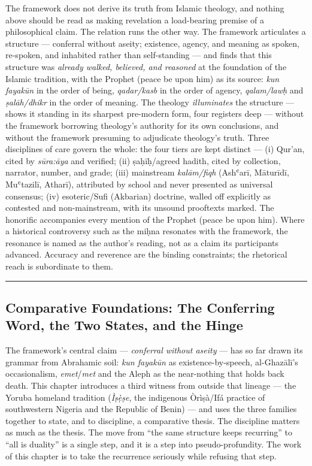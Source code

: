 \documentclass[11pt]{article}
\begin{document}
The framework does not derive its truth from Islamic theology, and nothing above should be read as making revelation a load-bearing premise of a philosophical claim. The relation runs the other way. The framework articulates a structure — conferral without aseity; existence, agency, and meaning as spoken, re-spoken, and inhabited rather than self-standing — and finds that this structure was \emph{already walked, believed, and reasoned} at the foundation of the Islamic tradition, with the Prophet (peace be upon him) as its source: \emph{kun fayakūn} in the order of being, \emph{qadar/\allowbreak{}kasb} in the order of agency, \emph{qalam/\allowbreak{}lawḥ} and \emph{ṣalāh/\allowbreak{}dhikr} in the order of meaning. The theology \emph{illuminates} the structure — shows it standing in its sharpest pre-modern form, four registers deep — without the framework borrowing theology's authority for its own conclusions, and without the framework presuming to adjudicate theology's truth. Three disciplines of care govern the whole: the four tiers are kept distinct — (i) Qur'an, cited by \emph{sūra:āya} and verified; (ii) ṣaḥīḥ/\allowbreak{}agreed hadith, cited by collection, narrator, number, and grade; (iii) mainstream \emph{kalām/\allowbreak{}fiqh} (Ashʿarī, Māturīdī, Muʿtazilī, Atharī), attributed by school and never presented as universal consensus; (iv) esoteric/\allowbreak{}Sufi (Akbarian) doctrine, walled off explicitly as contested and non-mainstream, with its unsound prooftexts marked. The honorific accompanies every mention of the Prophet (peace be upon him). Where a historical controversy such as the miḥna resonates with the framework, the resonance is named as the author's reading, not as a claim its participants advanced. Accuracy and reverence are the binding constraints; the rhetorical reach is subordinate to them.

\medskip\noindent\rule{\linewidth}{0.3pt}\medskip

\subsection*{Comparative Foundations: The Conferring Word, the Two States, and the Hinge}

The framework's central claim — \emph{conferral without aseity} — has so far drawn its grammar from Abrahamic soil: \emph{kun fayakūn} as existence-by-speech, al-Ghazālī's occasionalism, \emph{emet}/\allowbreak{}\emph{met} and the Aleph as the near-nothing that holds back death. This chapter introduces a third witness from outside that lineage — the Yoruba homeland tradition (\emph{Ìṣẹ̀ṣe}, the indigenous Òrìṣà/\allowbreak{}Ifá practice of southwestern Nigeria and the Republic of Benin) — and uses the three families together to state, and to discipline, a comparative thesis. The discipline matters as much as the thesis. The move from ``the same structure keeps recurring'' to ``all is duality'' is a single step, and it is a step into pseudo-profundity. The work of this chapter is to take the recurrence seriously while refusing that step.
\end{document}
